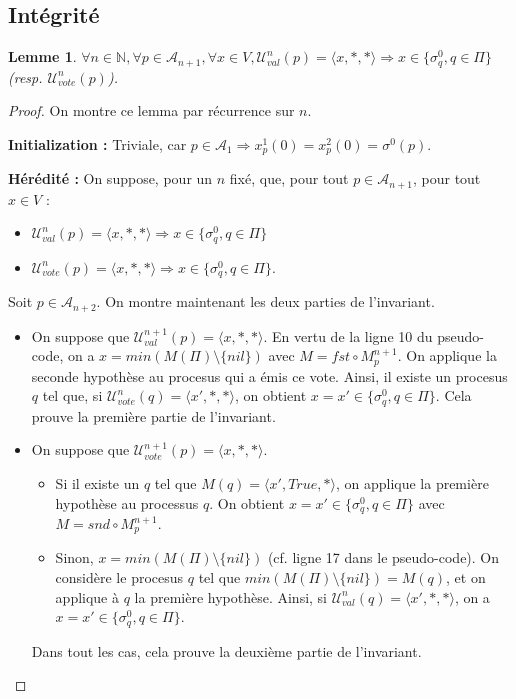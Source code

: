 \documentclass{article}
\newtheorem{lemma}{Lemme}
\begin{document}
\subsection{Intégrité}
\begin{lemma}
	$\forall n \in \mathds{N}, \forall p \in \mathcal{A}_{n+1}, \forall x \in V, \mathcal{U}_{val}^n(p) = \langle x, *, * \rangle \Rightarrow x \in \{\sigma^0_q, q \in \Pi\}$
	(resp. $\mathcal{U}_{vote}^n(p)$).
\end{lemma}
\begin{proof}

	On montre ce lemma par récurrence sur $n$.

	\textbf{Initialization :} Triviale, car $p \in \mathcal{A}_1 \Rightarrow x^1_p(0) = x^2_p(0) = \sigma^0(p)$.

	\textbf{Hérédité :} On suppose, pour un $n$ fixé, que, pour tout $p \in \mathcal{A}_{n+1}$, pour tout $x \in V$ :
	\begin{itemize}

		\item $\mathcal{U}_{val}^n(p)  = \langle x, *, * \rangle \Rightarrow x \in \{\sigma^0_q, q \in \Pi\}$
		\item $\mathcal{U}_{vote}^n(p) = \langle x, *, * \rangle \Rightarrow x \in \{\sigma^0_q, q \in \Pi\}$.

	\end{itemize}
	Soit $p \in \mathcal{A}_{n+2}$. On montre maintenant les deux parties de l'invariant.
	\begin{itemize}

		\item On suppose que $\mathcal{U}^{n+1}_{val}(p) = \langle x, *, * \rangle$.
			En vertu de la ligne 10 du pseudo-code, on a $x = min (M(\Pi) \setminus \{nil\})$ avec $M = fst \circ M^{n+1}_p$.
			On applique la seconde hypothèse au procesus qui a émis ce vote.
			Ainsi, il existe un procesus $q$ tel que, si $\mathcal{U}_{vote}^n(q) = \langle x', *, *\rangle$, on obtient $x = x' \in \{\sigma^0_q, q \in \Pi\}$.
			Cela prouve la première partie de l'invariant.
		\item On suppose que $\mathcal{U}^{n+1}_{vote}(p) = \langle x, *, * \rangle$.
			\begin{itemize}
				\item Si il existe un $q$ tel que $M(q) = \langle x', True, * \rangle$, on applique la première hypothèse au processus $q$.
					On obtient $x = x' \in \{\sigma^0_q, q \in \Pi\}$ avec $M = snd \circ M^{n+1}_p$.
				\item Sinon, $x = min (M(\Pi) \setminus \{nil\})$ (cf. ligne 17 dans le pseudo-code).
					On considère le procesus $q$ tel que $min (M(\Pi) \setminus \{nil\}) = M(q)$,
					et on applique à $q$ la première hypothèse. Ainsi, si $\mathcal{U}_{val}^n(q) = \langle x', *, * \rangle$, on a $x = x' \in \{\sigma^0_q, q \in \Pi\}$.
			\end{itemize}
			Dans tout les cas, cela prouve la deuxième partie de l'invariant.
	\end{itemize}
\end{proof}
\end{document}
